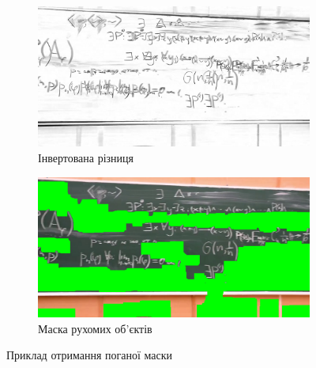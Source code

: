 \begin{figure}[h]
    \centering
    \ContinuedFloat
    \begin{subfigure}[c]{0.4\textwidth}
        \centering
        \includegraphics[width=\textwidth]{images/bad_example_inv_dif}
        \caption{Інвертована різниця
        \label{fig:seminar:bad_example_inv:c}
        }
    \end{subfigure}
    \begin{subfigure}[c]{0.4\textwidth}
        \centering
        \includegraphics[width=\textwidth]{images/bad_example_mask}
        \caption{Маска рухомих об'єктів
        \label{fig:seminar:bad_example_mask:c}
        }
    \end{subfigure}

    \caption{Приклад отримання поганої маски
    \label{fig:seminar:bad_example}
    }
\end{figure}
